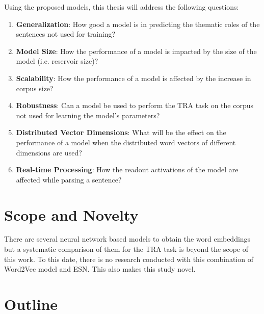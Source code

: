 Using the proposed models, this thesis will address the following questions:

\begin{enumerate}
\item \textbf{Generalization}: How good a model is in predicting the thematic roles of the sentences not used for training?

\item \textbf{Model Size}: How the performance of a model is impacted by the size of the model (i.e. reservoir size)?

\item \textbf{Scalability}: How the performance of a model is affected by the increase in corpus size?

\item \textbf{Robustness}: Can a model be used to perform the TRA task on the corpus not used for learning the model's parameters?

\item \textbf{Distributed Vector Dimensions}: What will be the effect on the performance of a model when the distributed word vectors of different dimensions are used?

\item \textbf{Real-time Processing}: How the readout activations of the model are affected while parsing a sentence?
\end{enumerate}
 
\section{Scope and Novelty}

There are several neural network based models to obtain the word embeddings \cite{w2v:glove, srl:collobert:2008, word_vec:turian:2010, word_vec:hinton:2009} but a systematic comparison of them for the TRA task is beyond the scope of this work. To this date, there is no research conducted with this combination of Word2Vec model and \acs{ESN}. This also makes this study novel.

\section{Outline}

